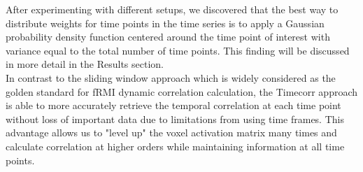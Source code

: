 \documentclass[12pt]{article}
\begin{document}
After experimenting with different setups, we discovered that the best way to distribute weights for time points in the time series is to apply a Gaussian probability density function centered around the time point of interest with variance equal to the total number of time points. This finding will be discussed in more detail in the Results section.\\

In contrast to the sliding window approach which is widely considered as the golden standard for fRMI dynamic correlation calculation, the Timecorr approach is able to more accurately retrieve the temporal correlation at each time point without loss of important data due to limitations from using time frames. This advantage allows us to "level up" the voxel activation matrix many times and calculate correlation at higher orders while maintaining information at all time points.\\
\end{document}
